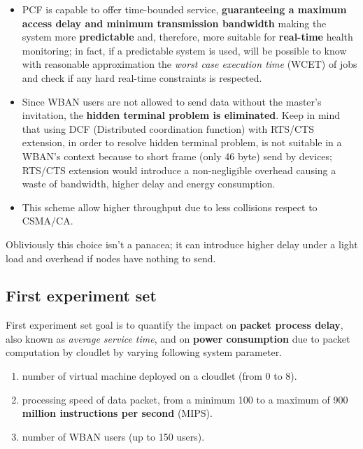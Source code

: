 \documentclass[sigchi]{acmart}
\begin{document}
\begin{itemize}

\item PCF is capable to offer time-bounded service, \textbf{guaranteeing a maximum access delay and minimum transmission bandwidth} making the system more \textbf{predictable} and, therefore, more suitable for \textbf{real-time} health monitoring; in fact, if a predictable system is used, will be possible to know with reasonable approximation the \textit{worst case execution time} (WCET) of jobs and check if any hard real-time constraints is respected.

\item Since WBAN users are not allowed to send data without the master's invitation, the \textbf{hidden terminal problem is eliminated}. Keep in mind that using DCF (Distributed coordination function) with RTS/CTS extension, in order to resolve hidden terminal problem, is not suitable in a WBAN's context because to short frame (only 46 byte) send by devices; RTS/CTS extension would introduce a non-negligible overhead causing a waste of bandwidth, higher delay and energy consumption.\cite{schiller2003mobile}

\item This scheme allow higher throughput due to less collisions respect to CSMA/CA.\cite{schiller2003mobile}

\end{itemize}

Obliviously this choice isn't a panacea; it can introduce higher delay under a light load and overhead if nodes have nothing to send.\cite{schiller2003mobile}

\subsection{First experiment set}

First experiment set goal is to quantify the impact on \textbf{packet process delay}, also known as \textit{average service time}, and on \textbf{power consumption} due to packet computation by cloudlet by varying following system parameter.

\begin{enumerate}
\item number of virtual machine deployed on a cloudlet (from 0 to 8).
\item processing speed of data packet, from a minimum 100 to a maximum of 900 \textbf{million instructions per second} (MIPS).
\item number of WBAN users (up to 150 users).
\end{enumerate}
\end{document}
